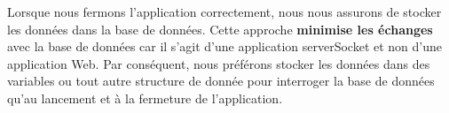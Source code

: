     \bigskip

    Lorsque nous fermons l’application correctement, nous nous assurons de stocker les données dans la base de données.
    Cette approche \textbf{minimise les échanges} avec la base de données car il s’agit d’une application serverSocket et non
    d’une application Web.
    Par conséquent, nous préférons stocker les données dans des variables ou tout autre structure de donnée pour interroger
    la base de données qu’au lancement et à la fermeture de l’application.

    \clearpage

